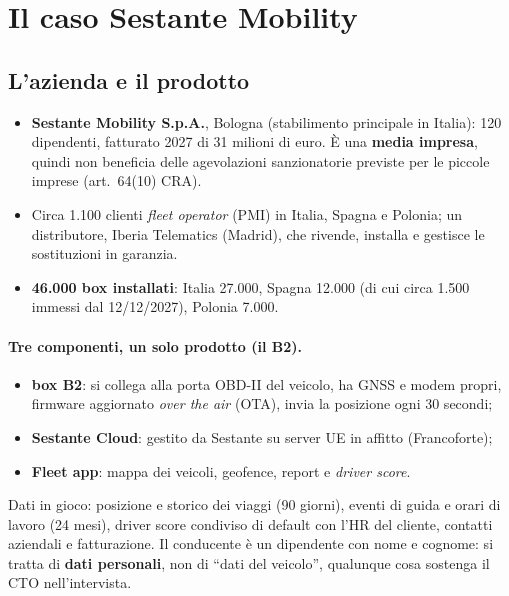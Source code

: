 \section{Il caso Sestante Mobility}

\subsection{L'azienda e il prodotto}
\begin{itemize}
  \item \textbf{Sestante Mobility S.p.A.}, Bologna (stabilimento principale in Italia): 120 dipendenti,
    fatturato 2027 di 31 milioni di euro. È una \textbf{media impresa}, quindi non beneficia delle
    agevolazioni sanzionatorie previste per le piccole imprese (art.~64(10) CRA).
  \item Circa 1.100 clienti \emph{fleet operator} (PMI) in Italia, Spagna e Polonia; un distributore,
    Iberia Telematics (Madrid), che rivende, installa e gestisce le sostituzioni in garanzia.
  \item \textbf{46.000 box installati}: Italia 27.000, Spagna 12.000 (di cui circa 1.500 immessi dal
    12/12/2027), Polonia 7.000.
\end{itemize}

\paragraph{Tre componenti, un solo prodotto (il B2).}
\begin{itemize}
  \item \textbf{box B2}: si collega alla porta OBD-II del veicolo, ha GNSS e modem propri, firmware
    aggiornato \emph{over the air} (OTA), invia la posizione ogni 30 secondi;
  \item \textbf{Sestante Cloud}: gestito da Sestante su server UE in affitto (Francoforte);
  \item \textbf{Fleet app}: mappa dei veicoli, geofence, report e \emph{driver score}.
\end{itemize}
Dati in gioco: posizione e storico dei viaggi (90 giorni), eventi di guida e orari di lavoro
(24 mesi), driver score condiviso di default con l'HR del cliente, contatti aziendali e fatturazione.
Il conducente è un dipendente con nome e cognome: si tratta di \textbf{dati personali}, non di
``dati del veicolo'', qualunque cosa sostenga il CTO nell'intervista.

